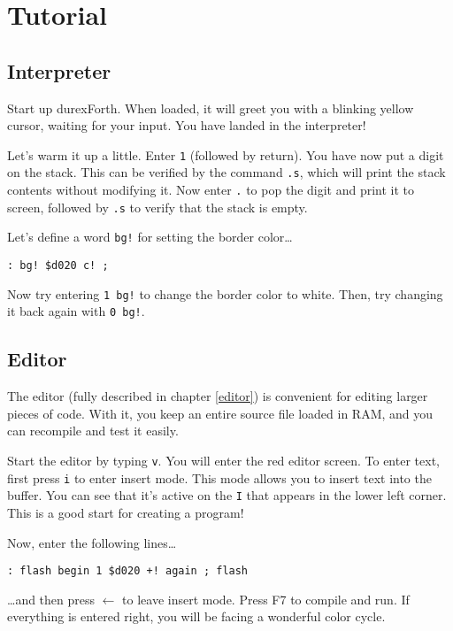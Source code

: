 \chapter{Tutorial}

\section{Interpreter}

Start up durexForth. When loaded, it will greet you with a blinking yellow cursor, waiting for your input. You have landed in the interpreter!

Let's warm it up a little. Enter \texttt{1} (followed by return). You have now put a digit on the stack. This can be verified by the command \texttt{.s}, which will print the stack contents without modifying it. Now enter \texttt{.} to pop the digit and print it to screen, followed by \texttt{.s} to verify that the stack is empty.

Let's define a word \texttt{bg!} for setting the border color\ldots

\begin{verbatim}
: bg! $d020 c! ;
\end{verbatim}

Now try entering \texttt{1 bg!} to change the border color to white.
Then, try changing it back again with \texttt{0 bg!}.

\section{Editor}

The editor (fully described in chapter \ref{editor}) is convenient for editing larger pieces of code. With it, you keep an entire source file loaded in RAM, and you can recompile and test it easily.

Start the editor by typing \texttt{v}. You will enter the red editor screen. To enter text, first press \texttt{i} to enter insert mode. This mode allows you to insert text into the buffer. You can see that it's active on the \texttt{I} that appears in the lower left corner. This is a good start for creating a program!

Now, enter the following lines\ldots

\begin{verbatim}
: flash begin 1 $d020 +! again ; flash
\end{verbatim}

\ldots and then press $\leftarrow$ to leave insert mode.
Press \textsc{F7} to compile and run. If everything is entered right, you will be facing a wonderful color cycle.

